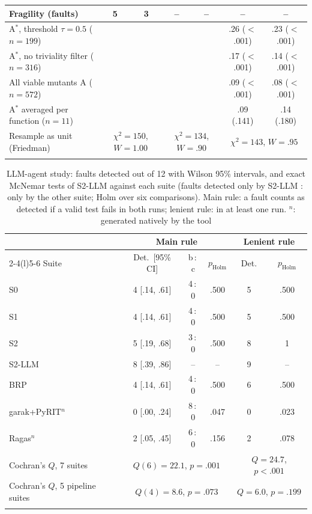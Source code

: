 \begin{table}[!t]
\begin{tabular}{@{}>{\raggedright\arraybackslash}lcccccc@{}}
Fragility (faults) & 5 & 3 & -- & -- & -- & -- \\
\midrule
A$^{*}$, threshold $\tau=0.5$ ($n=199$) & \multicolumn{4}{c}{} & .26 ($<$.001) & .23 ($<$.001) \\
A$^{*}$, no triviality filter ($n=316$) & \multicolumn{4}{c}{} & .17 ($<$.001) & .14 ($<$.001) \\
All viable mutants A ($n=572$) & \multicolumn{4}{c}{} & .09 ($<$.001) & .08 ($<$.001) \\
A$^{*}$ averaged per function ($n=11$) & \multicolumn{4}{c}{} & .09 (.141) & .14 (.180) \\
\midrule
Resample as unit (Friedman) & \multicolumn{2}{c}{$\chi^2=150$, $W=1.00$} & \multicolumn{2}{c}{$\chi^2=134$, $W=.90$} & \multicolumn{2}{c}{$\chi^2=143$, $W=.95$} \\
\botrule
\end{tabular}
\end{table}

\begin{table}[!t]
\caption{LLM-agent study: faults detected out of 12 with Wilson 95\% intervals, and exact McNemar tests of S2-LLM against each suite (faults detected only by S2-LLM : only by the other suite; Holm over six comparisons). Main rule: a fault counts as detected if a valid test fails in both runs; lenient rule: in at least one run. $^{n}$: generated natively by the tool}
\label{tab:llmstats}
\footnotesize
\setlength{\tabcolsep}{2.5pt}
\begin{tabular}{@{}lccccc@{}}
\toprule
 & \multicolumn{3}{c}{Main rule} & \multicolumn{2}{c}{Lenient rule} \\
\cmidrule(lr){2-4}\cmidrule(l){5-6}
Suite & Det.\ [95\% CI] & b\,:\,c & $p_{\mathrm{Holm}}$ & Det. & $p_{\mathrm{Holm}}$ \\
\midrule
S0 & 4 [.14, .61] & 4\,:\,0 & .500 & 5 & .500 \\
S1 & 4 [.14, .61] & 4\,:\,0 & .500 & 5 & .500 \\
S2 & 5 [.19, .68] & 3\,:\,0 & .500 & 8 & 1 \\
S2-LLM & 8 [.39, .86] & -- & -- & 9 & -- \\
BRP & 4 [.14, .61] & 4\,:\,0 & .500 & 6 & .500 \\
garak+PyRIT$^{n}$ & 0 [.00, .24] & 8\,:\,0 & .047 & 0 & .023 \\
Ragas$^{n}$ & 2 [.05, .45] & 6\,:\,0 & .156 & 2 & .078 \\
\midrule
Cochran's $Q$, 7 suites & \multicolumn{3}{c}{$Q(6)=22.1$, $p=.001$} & \multicolumn{2}{c}{$Q=24.7$, $p<.001$} \\
Cochran's $Q$, 5 pipeline suites & \multicolumn{3}{c}{$Q(4)=8.6$, $p=.073$} & \multicolumn{2}{c}{$Q=6.0$, $p=.199$} \\
\botrule
\end{tabular}
\end{table}

